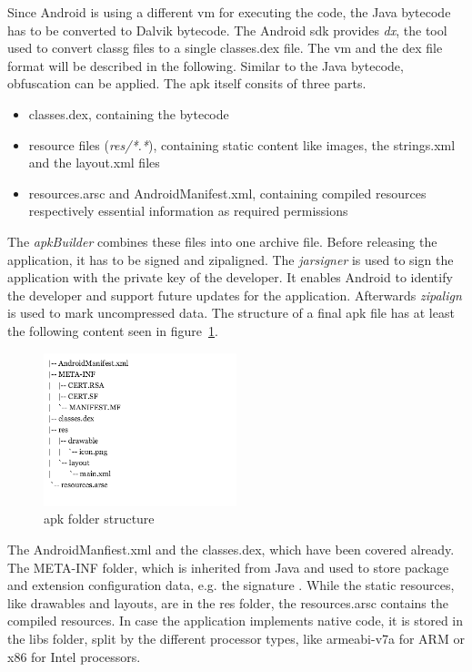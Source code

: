 \newline
Since Android is using a different \gls{vm} for executing the code, the Java bytecode has to be converted to Dalvik bytecode.
The Android \gls{sdk} provides \textit{dx}, the tool used to convert \gls{classg} files to a single classes.dex file.
The \gls{vm} and the \gls{dex} file format will be described in the following.
Similar to the Java bytecode, obfuscation can be applied.
\newline
The \gls{apk} itself consits of three parts.
\begin{itemize}
\item classes.dex, containing the bytecode
\item resource files (\textit{res/*.*}), containing static content like images, the strings.xml and the layout.xml files
\item resources.arsc and AndroidManifest.xml, containing compiled resources respectively essential information as required permissions
\end{itemize}
The \textit{apkBuilder} combines these files into one archive file. 
\newline
Before releasing the application, it has to be signed and zipaligned.
The \textit{jarsigner} is used to sign the application with the private key of the developer.
It enables Android to identify the developer and support future updates for the application.
Afterwards \textit{zipalign} is used to mark uncompressed data. \cite{androidPublishSign} \cite{andevconDalvikART}
\newline
\newline
The structure of a final \gls{apk} file has at least the following content seen in figure~\ref{fig:apkfolder}.
\begin{figure}[h]
    \centering
    \includegraphics[width=0.5\textwidth]{data/apkfolder.png}
    \caption{\gls{apk} folder structure}
    \label{fig:apkfolder}
\end{figure}
The AndroidManfiest.xml and the classes.dex, which have been covered already.
The META-INF folder, which is inherited from Java and used to store package and extension configuration data, e.g. the signature \cite{metaJava}.
While the static resources, like drawables and layouts, are in the res folder, the resources.arsc contains the compiled resources.
In case the application implements native code, it is stored in the libs folder, split by the different processor types, like armeabi-v7a for ARM or x86 for Intel processors. \cite{kovachevaMaster} \cite{ehringerDalvik}
